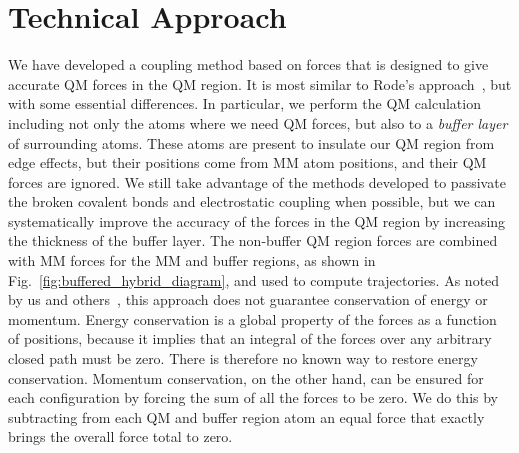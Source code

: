 \documentclass[11pt]{revtex4}
\begin{document}
% 
% 
% 


\section{Technical Approach}

We have developed a coupling method based on forces that is designed
to give accurate QM forces in the QM region.  It is most similar
to Rode's approach~\cite{kerdcharoen_chem_phys_1996a}, but with
some essential differences.  In particular, we perform the QM
calculation including not only the atoms where we need QM forces,
but also to a {\em buffer layer} of surrounding atoms.  These atoms
are present to insulate our QM region from edge effects, but their
positions come from MM atom positions, and their QM forces are ignored. 
We still take advantage of the methods
developed to passivate the broken covalent bonds and electrostatic
coupling when possible, but we can systematically improve the
accuracy of the forces in the QM region by increasing the thickness
of the buffer layer.  The non-buffer QM region forces are combined
with MM forces for the MM and buffer regions, as shown in
Fig.~\ref{fig:buffered_hybrid_diagram}, and used to compute
trajectories.  As noted by us and
others~\cite{heyden_j_phys_chem_b_2007a,bernstein_rep_prog_phys_2009a},
this approach does not guarantee conservation of energy or momentum.
Energy conservation is a global property of the forces as a function
of positions, because it implies that an integral of the forces
over any arbitrary closed path must be zero.  There is therefore
no known way to restore energy conservation.  Momentum conservation,
on the other hand, can be ensured for each configuration by forcing
the sum of all the forces to be zero.  We do this by subtracting
from each QM and buffer region atom an equal force that exactly
brings the overall force total to zero.
\end{document}
